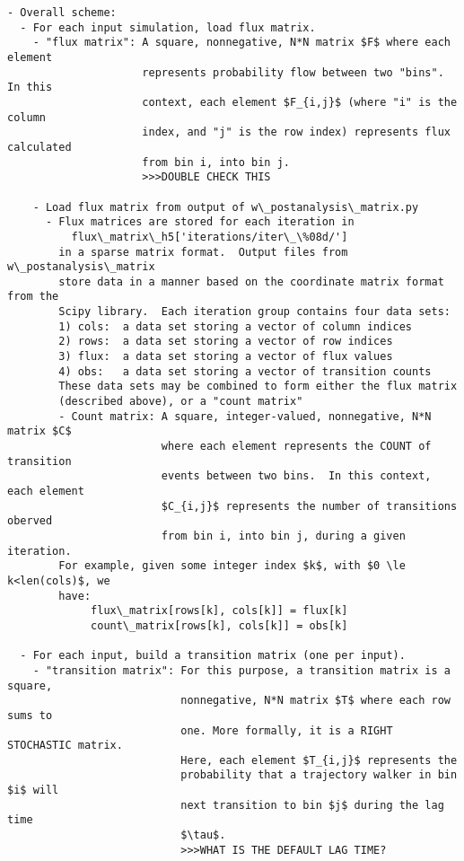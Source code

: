 \documentclass[10pt]{article}
\begin{document}
\maketitle

\begin{Verbatim}[commandchars=\\\{\},codes={\catcode`$=3\catcode`^=7\catcode`_=8}]
- Overall scheme:
  - For each input simulation, load flux matrix.
    - "flux matrix": A square, nonnegative, N*N matrix $F$ where each element
                     represents probability flow between two "bins". In this 
                     context, each element $F_{i,j}$ (where "i" is the column 
                     index, and "j" is the row index) represents flux calculated
                     from bin i, into bin j.
                     >>>DOUBLE CHECK THIS

    - Load flux matrix from output of w\_postanalysis\_matrix.py
      - Flux matrices are stored for each iteration in 
          flux\_matrix\_h5['iterations/iter\_\%08d/']
        in a sparse matrix format.  Output files from w\_postanalysis\_matrix
        store data in a manner based on the coordinate matrix format from the 
        Scipy library.  Each iteration group contains four data sets:
        1) cols:  a data set storing a vector of column indices
        2) rows:  a data set storing a vector of row indices
        3) flux:  a data set storing a vector of flux values
        4) obs:   a data set storing a vector of transition counts
        These data sets may be combined to form either the flux matrix
        (described above), or a "count matrix"
        - Count matrix: A square, integer-valued, nonnegative, N*N matrix $C$ 
                        where each element represents the COUNT of transition 
                        events between two bins.  In this context, each element
                        $C_{i,j}$ represents the number of transitions oberved 
                        from bin i, into bin j, during a given iteration.
        For example, given some integer index $k$, with $0 \le k<len(cols)$, we
        have:
             flux\_matrix[rows[k], cols[k]] = flux[k]
             count\_matrix[rows[k], cols[k]] = obs[k]

  - For each input, build a transition matrix (one per input).
    - "transition matrix": For this purpose, a transition matrix is a square,
                           nonnegative, N*N matrix $T$ where each row sums to 
                           one. More formally, it is a RIGHT STOCHASTIC matrix.  
                           Here, each element $T_{i,j}$ represents the 
                           probability that a trajectory walker in bin $i$ will
                           next transition to bin $j$ during the lag time 
                           $\tau$. 
                           >>>WHAT IS THE DEFAULT LAG TIME?


\end{Verbatim}
\end{document}

